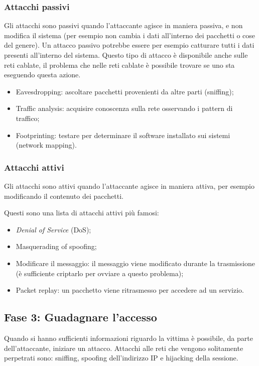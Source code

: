 \subsubsection{Attacchi passivi}

Gli attacchi sono passivi quando l'attaccante agisce in maniera passiva, e non
modifica il sistema (per esempio non cambia i dati all'interno dei pacchetti o
cose del genere). Un attacco passivo potrebbe essere per esempio catturare
tutti i dati presenti all'interno del sistema. Questo tipo di attacco è
disponibile anche sulle reti cablate, il problema che nelle reti cablate è
possibile trovare se uno sta eseguendo questa azione.

\begin{itemize}
\item Eavesdropping: ascoltare pacchetti provenienti da altre parti (sniffing);
\item Traffic analysis: acquisire conoscenza sulla rete osservando i pattern di
traffico;
\item Footprinting: testare per determinare il software installato sui sistemi
(network mapping).
\end{itemize}

\subsubsection{Attacchi attivi}

Gli attacchi sono attivi quando l'attaccante agisce in maniera attiva, per
esempio modificando il contenuto dei pacchetti.

Questi sono una lista di attacchi attivi più famosi:
\begin{itemize}
\item \textit{Denial of Service} (DoS);
\item Masquerading of spoofing;
\item Modificare il messaggio: il messaggio viene modificato durante la
trasmissione (è sufficiente criptarlo per ovviare a questo problema);
\item Packet replay: un pacchetto viene ritrasmesso per accedere ad un servizio.
\end{itemize}

\subsection{Fase 3: Guadagnare l'accesso}

Quando si hanno sufficienti informazioni riguardo la vittima è possibile, da
parte dell'attaccante, iniziare un attacco.
Attacchi alle reti che vengono solitamente perpetrati sono: sniffing, spoofing 
dell'indirizzo IP e hijacking della sessione.

